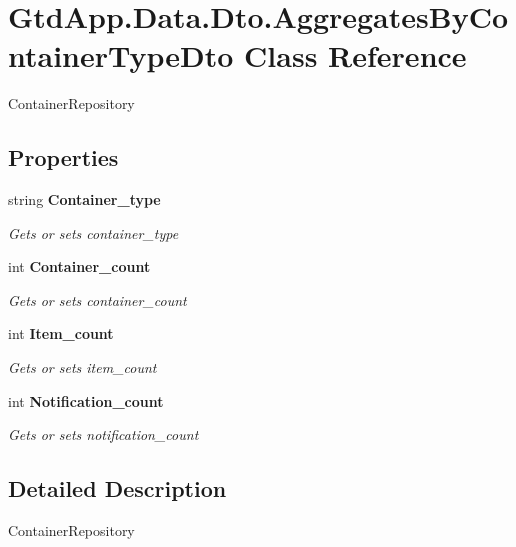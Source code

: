 \section{Gtd\+App.\+Data.\+Dto.\+Aggregates\+By\+Container\+Type\+Dto Class Reference}
\label{class_gtd_app_1_1_data_1_1_dto_1_1_aggregates_by_container_type_dto}


Container\+Repository  


\subsection*{Properties}
\begin{DoxyCompactItemize}
\item 
string \textbf{ Container\+\_\+type}\hspace{0.3cm}{\ttfamily  [get, set]}
\begin{DoxyCompactList}\small\item\em Gets or sets container\+\_\+type \end{DoxyCompactList}\item 
int \textbf{ Container\+\_\+count}\hspace{0.3cm}{\ttfamily  [get, set]}
\begin{DoxyCompactList}\small\item\em Gets or sets container\+\_\+count \end{DoxyCompactList}\item 
int \textbf{ Item\+\_\+count}\hspace{0.3cm}{\ttfamily  [get, set]}
\begin{DoxyCompactList}\small\item\em Gets or sets item\+\_\+count \end{DoxyCompactList}\item 
int \textbf{ Notification\+\_\+count}\hspace{0.3cm}{\ttfamily  [get, set]}
\begin{DoxyCompactList}\small\item\em Gets or sets notification\+\_\+count \end{DoxyCompactList}\end{DoxyCompactItemize}


\subsection{Detailed Description}
Container\+Repository 



